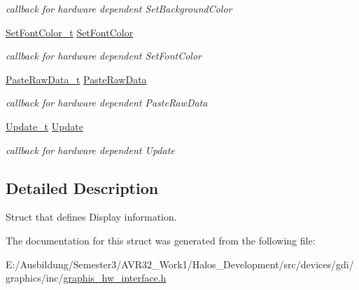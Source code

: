 \begin{CompactItemize}
\begin{CompactList}\small\item\em callback for hardware dependent SetBackgroundColor \item\end{CompactList}\item 
\hypertarget{struct_display_info__t_9b33d625be9a707ae9f45c0bd8577d61}{
\hyperlink{group__graphic__hw__interface_g2720234f07ba67eb55362ad2b1b3d102}{SetFontColor\_\-t} \hyperlink{struct_display_info__t_9b33d625be9a707ae9f45c0bd8577d61}{SetFontColor}}
\label{struct_display_info__t_9b33d625be9a707ae9f45c0bd8577d61}

\begin{CompactList}\small\item\em callback for hardware dependent SetFontColor \item\end{CompactList}\item 
\hypertarget{struct_display_info__t_22deda6e2dfa78c21ffe478d9b6199b8}{
\hyperlink{group__graphic__hw__interface_g23f1f3d777d2fee79309669dcd30cdac}{PasteRawData\_\-t} \hyperlink{struct_display_info__t_22deda6e2dfa78c21ffe478d9b6199b8}{PasteRawData}}
\label{struct_display_info__t_22deda6e2dfa78c21ffe478d9b6199b8}

\begin{CompactList}\small\item\em callback for hardware dependent PasteRawData \item\end{CompactList}\item 
\hypertarget{struct_display_info__t_848699324d7d18298a49440ad065dc51}{
\hyperlink{group__graphic__hw__interface_gd6ccf1837a820c03c88a134373cba158}{Update\_\-t} \hyperlink{struct_display_info__t_848699324d7d18298a49440ad065dc51}{Update}}
\label{struct_display_info__t_848699324d7d18298a49440ad065dc51}

\begin{CompactList}\small\item\em callback for hardware dependent Update \item\end{CompactList}\end{CompactItemize}


\subsection{Detailed Description}
Struct that defines Display information. 

The documentation for this struct was generated from the following file:\begin{CompactItemize}
\item 
E:/Ausbildung/Semester3/AVR32\_\-Work1/Halos\_\-Development/src/devices/gdi/graphics/inc/\hyperlink{graphis__hw__interface_8h}{graphis\_\-hw\_\-interface.h}\end{CompactItemize}
